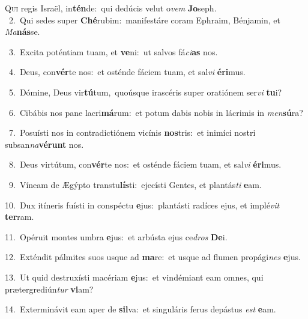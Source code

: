 \lettrine{\initial\textcolor{\initialcolor}{Q}}{ui} regis Israël, in\-\textbf{tén}\-de:~\star qui dedúcis velut o\textit{vem} \textbf{Jo}\-seph.\\
{\numbfont\textcolor{\numbcolor}{~2.}}~Qui sedes super \textbf{Ché}\-rubim:~\star manifestáre coram Ephraim, Bénjamin, et \textit{Ma}\-\textbf{nás}se.\par
{\numbfont\textcolor{\numbcolor}{~3.}}~Excita poténtiam tuam, et \textbf{ve}\-ni:~\star ut salvos fá\-\textit{ci}\-\textbf{as} nos.\par
{\numbfont\textcolor{\numbcolor}{~4.}}~Deus, con\-\textbf{vér}\-te nos:~\star et osténde fáciem tuam, et sal\textit{vi} \textbf{é}\-\textbf{ri}mus.\par
{\numbfont\textcolor{\numbcolor}{~5.}}~Dómine, Deus vir\-\textbf{tú}\-tum,~\star quoúsque irascéris super oratiónem ser\textit{vi} \textbf{tu}\-i?\par
{\numbfont\textcolor{\numbcolor}{~6.}}~Cibábis nos pane lacri\-\textbf{má}\-rum:~\star et potum dabis nobis in lácrimis in \textit{men}\-\textbf{sú}ra?\par
{\numbfont\textcolor{\numbcolor}{~7.}}~Posuísti nos in contradictiónem vicínis \textbf{nos}\-tris:~\star et inimíci nostri subsan\-\textit{na}\-\textbf{vé}\textbf{runt} nos.\par
{\numbfont\textcolor{\numbcolor}{~8.}}~Deus virtútum, con\-\textbf{vér}\-te nos:~\star et osténde fáciem tuam, et sal\textit{vi} \textbf{é}\-\textbf{ri}mus.\par
{\numbfont\textcolor{\numbcolor}{~9.}}~Víneam de Ægýpto transtu\-\textbf{lís}\-ti:~\star ejecísti Gentes, et plantás\textit{ti} \textbf{e}\-am.\par
{\numbfont\textcolor{\numbcolor}{10.}}~Dux itíneris fuísti in conspéctu \textbf{e}\-jus:~\star plantásti radíces ejus, et implé\textit{vit} \textbf{ter}\-ram.\par
{\numbfont\textcolor{\numbcolor}{11.}}~Opéruit montes umbra \textbf{e}\-jus:~\star et arbústa ejus ce\textit{dros} \textbf{De}\-i.\par
{\numbfont\textcolor{\numbcolor}{12.}}~Exténdit pálmites suos usque ad \textbf{ma}\-re:~\star et usque ad flumen propági\textit{nes} \textbf{e}\-jus.\par
{\numbfont\textcolor{\numbcolor}{13.}}~Ut quid destruxísti macériam \textbf{e}\-jus:~\star et vindémiant eam omnes, qui prætergrediún\textit{tur} \textbf{vi}\-am?\par
{\numbfont\textcolor{\numbcolor}{14.}}~Exterminávit eam aper de \textbf{sil}\-va:~\star et singuláris ferus depástus \textit{est} \textbf{e}\-am.\par
